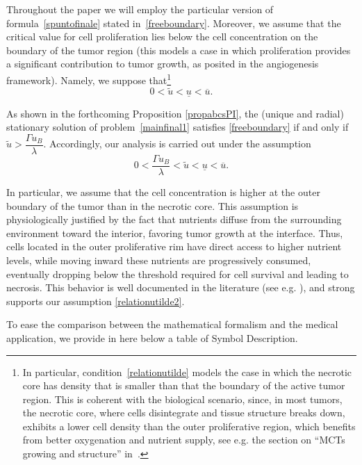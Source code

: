 \documentclass[12pt,a4paper,intlimits,sumlimits]{amsart}
\theoremstyle{definition}
\theoremstyle{plain}
\numberwithin{equation}{section}
\begin{document}
Throughout the paper we will employ the particular version of formula~\eqref{spuntofinale} stated in~\eqref{freeboundary}.
Moreover, we assume that the critical
value for cell proliferation
lies below the cell concentration on the boundary of the tumor region (this models a case in which
proliferation provides a significant contribution
to tumor growth, as posited in the angiogenesis framework). Namely, we suppose that\footnote{In particular, condition~\eqref{relationutilde} models the case in which the necrotic core has density that is
smaller than that the boundary of the active tumor region.
This is coherent with the biological scenario, since,
in most tumors, the necrotic core, where cells disintegrate and tissue structure breaks down, exhibits a lower cell density than the outer proliferative region, which benefits from better oxygenation and nutrient supply, see e.g. the section on ``MCTs growing and structure'' in~\cite{CHALLE}.}
\begin{equation}\label{relationutilde}
0<\widetilde u < \underline{u} < \overline{u}.
\end{equation}

As shown in the forthcoming Proposition \ref{propabcsPI}, the (unique and radial) stationary solution of problem~\eqref{mainfinal1} satisfies \eqref{freeboundary} if and only if $\widetilde u>\dfrac{\Gamma u_B}{\lambda}$.
Accordingly, our analysis is carried out under the assumption
\begin{equation}\label{relationutilde2}
0<\frac{\Gamma u_B}{\lambda}<\widetilde u < \underline{u} < \overline{u}.
\end{equation}

In particular, we assume that the cell concentration is higher at the outer boundary of the tumor than in the necrotic core. This assumption is physiologically justified by the fact that nutrients diffuse from the surrounding environment toward the interior,
favoring tumor growth at the interface. Thus, cells located in the outer proliferative rim have direct access to higher nutrient levels, while moving inward these nutrients are progressively consumed, eventually dropping below the threshold required for cell survival and leading to necrosis. This behavior is well documented in the literature (see e.g. \cite{XU2016}), and strong supports our assumption \eqref{relationutilde2}.

To ease the comparison between the mathematical formalism and the medical application,
we provide in here below a table of Symbol Description.
\smallskip
\end{document}
